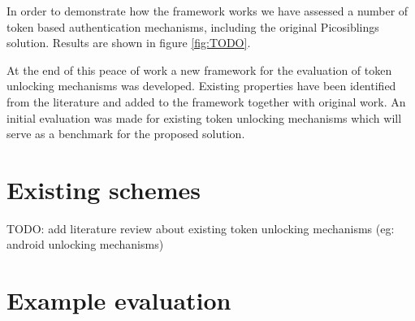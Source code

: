 In order to demonstrate how the framework works we have assessed a number of token based authentication mechanisms, including the original Picosiblings solution. Results are shown in figure \ref{fig:TODO}. 

At the end of this peace of work a new framework for the evaluation of token unlocking mechanisms was developed. Existing properties have been identified from the literature and added to the framework together with original work. An initial evaluation was made for existing token unlocking mechanisms which will serve as a benchmark for the proposed solution.

\section{Existing schemes}
TODO: add literature review about existing token unlocking mechanisms (eg: android unlocking mechanisms)

\section{Example evaluation}